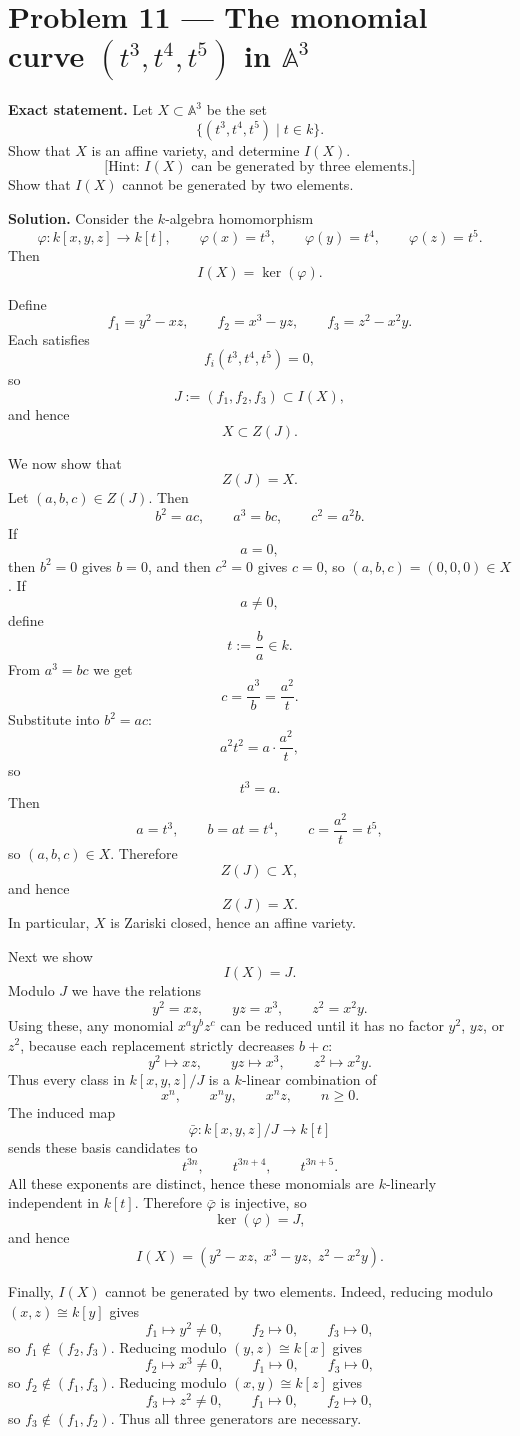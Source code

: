 \documentclass[12pt,a4paper]{article}
\theoremstyle{plain}
\theoremstyle{definition}      %
\begin{document}
\section{Problem 11 — The monomial curve $(t^3,t^4,t^5)$ in $\mathbb A^3$}

\textbf{Exact statement.}
Let $X\subset \mathbb A^3$ be the set
\[
\{(t^3,t^4,t^5)\mid t\in k\}.
\]
Show that $X$ is an affine variety, and determine $I(X)$.
\[
\text{[Hint: $I(X)$ can be generated by three elements.]}
\]
Show that $I(X)$ cannot be generated by two elements.

\textbf{Solution.}
Consider the $k$-algebra homomorphism
\[
\varphi:k[x,y,z]\to k[t],
\qquad
\varphi(x)=t^3,
\qquad
\varphi(y)=t^4,
\qquad
\varphi(z)=t^5.
\]
Then
\[
I(X)=\ker(\varphi).
\]

Define
\[
f_1
=
y^2-xz,
\qquad
f_2
=
x^3-yz,
\qquad
f_3
=
z^2-x^2y.
\]
Each satisfies
\[
f_i(t^3,t^4,t^5)=0,
\]
so
\[
J:=(f_1,f_2,f_3)\subset I(X),
\]
and hence
\[
X\subset Z(J).
\]

We now show that
\[
Z(J)=X.
\]
Let $(a,b,c)\in Z(J)$.
Then
\[
b^2=ac,
\qquad
a^3=bc,
\qquad
c^2=a^2b.
\]
If
\[
a=0,
\]
then $b^2=0$ gives $b=0$, and then $c^2=0$ gives $c=0$, so $(a,b,c)=(0,0,0)\in X$.
If
\[
a\neq 0,
\]
define
\[
t:=\frac{b}{a}\in k.
\]
From $a^3=bc$ we get
\[
c=\frac{a^3}{b}=\frac{a^2}{t}.
\]
Substitute into $b^2=ac$:
\[
a^2t^2
=
a\cdot \frac{a^2}{t},
\]
so
\[
t^3=a.
\]
Then
\[
a=t^3,
\qquad
b=at=t^4,
\qquad
c=\frac{a^2}{t}=t^5,
\]
so $(a,b,c)\in X$. Therefore
\[
Z(J)\subset X,
\]
and hence
\[
Z(J)=X.
\]
In particular, $X$ is Zariski closed, hence an affine variety.

Next we show
\[
I(X)=J.
\]
Modulo $J$ we have the relations
\[
y^2=xz,
\qquad
yz=x^3,
\qquad
z^2=x^2y.
\]
Using these, any monomial $x^ay^bz^c$ can be reduced until it has no factor $y^2$, $yz$, or $z^2$,
because each replacement strictly decreases $b+c$:
\[
y^2\mapsto xz,
\qquad
yz\mapsto x^3,
\qquad
z^2\mapsto x^2y.
\]
Thus every class in $k[x,y,z]/J$ is a $k$-linear combination of
\[
x^n,
\qquad
x^ny,
\qquad
x^nz,
\qquad
n\ge 0.
\]
The induced map
\[
\bar\varphi:k[x,y,z]/J\to k[t]
\]
sends these basis candidates to
\[
t^{3n},
\qquad
t^{3n+4},
\qquad
t^{3n+5}.
\]
All these exponents are distinct, hence these monomials are $k$-linearly independent in $k[t]$.
Therefore $\bar\varphi$ is injective, so
\[
\ker(\varphi)=J,
\]
and hence
\[
I(X)
=
(y^2-xz,\;x^3-yz,\;z^2-x^2y).
\]

Finally, $I(X)$ cannot be generated by two elements.
Indeed, reducing modulo $(x,z)\cong k[y]$ gives
\[
f_1\mapsto y^2\neq 0,
\qquad
f_2\mapsto 0,
\qquad
f_3\mapsto 0,
\]
so $f_1\notin (f_2,f_3)$.
Reducing modulo $(y,z)\cong k[x]$ gives
\[
f_2\mapsto x^3\neq 0,
\qquad
f_1\mapsto 0,
\qquad
f_3\mapsto 0,
\]
so $f_2\notin (f_1,f_3)$.
Reducing modulo $(x,y)\cong k[z]$ gives
\[
f_3\mapsto z^2\neq 0,
\qquad
f_1\mapsto 0,
\qquad
f_2\mapsto 0,
\]
so $f_3\notin (f_1,f_2)$.
Thus all three generators are necessary.
\end{document}
